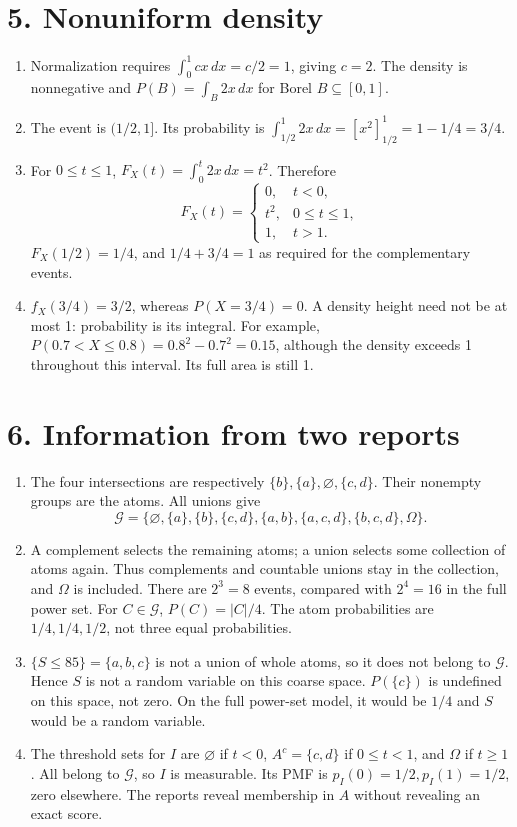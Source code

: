 \documentclass[11pt,a4paper]{article}
\begin{document}
\section*{5. Nonuniform density}
\begin{enumerate}
\item Normalization requires $\int_0^1cx\,dx=c/2=1$, giving $c=2$. The density is nonnegative and $P(B)=\int_B2x\,dx$ for Borel $B\subseteq[0,1]$.
\item The event is $(1/2,1]$. Its probability is $\int_{1/2}^1 2x\,dx=[x^2]_{1/2}^1=1-1/4=3/4$.
\item For $0\le t\le1$, $F_X(t)=\int_0^t2x\,dx=t^2$. Therefore
\[F_X(t)=\begin{cases}0,&t<0,\\t^2,&0\le t\le1,\\1,&t>1.\end{cases}\]
$F_X(1/2)=1/4$, and $1/4+3/4=1$ as required for the complementary events.
\item $f_X(3/4)=3/2$, whereas $P(X=3/4)=0$. A density height need not be at most 1: probability is its integral. For example, $P(0.7<X\le0.8)=0.8^2-0.7^2=0.15$, although the density exceeds 1 throughout this interval. Its full area is still 1.
\end{enumerate}

\section*{6. Information from two reports}
\begin{enumerate}
\item The four intersections are respectively $\{b\},\{a\},\varnothing,\{c,d\}$. Their nonempty groups are the atoms. All unions give
\[\mathcal G=\{\varnothing,\{a\},\{b\},\{c,d\},\{a,b\},\{a,c,d\},\{b,c,d\},\Omega\}.\]
\item A complement selects the remaining atoms; a union selects some collection of atoms again. Thus complements and countable unions stay in the collection, and $\Omega$ is included. There are $2^3=8$ events, compared with $2^4=16$ in the full power set. For $C\in\mathcal G$, $P(C)=|C|/4$. The atom probabilities are $1/4,1/4,1/2$, not three equal probabilities.
\item $\{S\le85\}=\{a,b,c\}$ is not a union of whole atoms, so it does not belong to $\mathcal G$. Hence $S$ is not a random variable on this coarse space. $P(\{c\})$ is undefined on this space, not zero. On the full power-set model, it would be $1/4$ and $S$ would be a random variable.
\item The threshold sets for $I$ are $\varnothing$ if $t<0$, $A^c=\{c,d\}$ if $0\le t<1$, and $\Omega$ if $t\ge1$. All belong to $\mathcal G$, so $I$ is measurable. Its PMF is $p_I(0)=1/2,p_I(1)=1/2$, zero elsewhere. The reports reveal membership in $A$ without revealing an exact score.
\end{enumerate}
\end{document}
